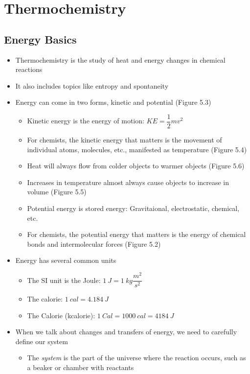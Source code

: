 \documentclass[12pt, openany, letterpaper]{memoir}
\begin{document}
\chapter{Thermochemistry}

\section{Energy Basics}
\begin{itemize}
	\item Thermochemistry is the study of heat and energy changes in chemical reactions
	\item It also includes topics like entropy and spontaneity
	\item Energy can come in two forms, kinetic and potential (Figure 5.3)
    \begin{itemize}
      \item Kinetic energy is the energy of motion: $KE=\dfrac{1}{2}mv^2$
      \item For chemists, the kinetic energy that matters is the movement of individual atoms, molecules, etc., manifested as temperature (Figure 5.4)
      \item Heat will always flow from colder objects to warmer objects (Figure 5.6)
      \item Increases in temperature almost always cause objects to increase in volume (Figure 5.5)
      \item Potential energy is stored energy: Gravitaional, electrostatic, chemical, etc.
      \item For chemists, the potential energy that matters is the energy of chemical bonds and intermolecular forces (Figure 5.2)
    \end{itemize}
	\item Energy has several common units
    \begin{itemize}
      \item The SI unit is the Joule: $1~J=1~kg\dfrac{m^2}{s^2}$
      \item The calorie: $1~cal=4.184~J$
      \item The Calorie (kcalorie): $1~Cal=1000~cal=4184~J$
    \end{itemize}
  \item When we talk about changes and transfers of energy, we need to carefully define our system
    \begin{itemize}
      \item The \emph{system} is the part of the universe where the reaction occurs, such as a beaker or chamber with reactants

\end{itemize}
\end{itemize}
\end{document}
